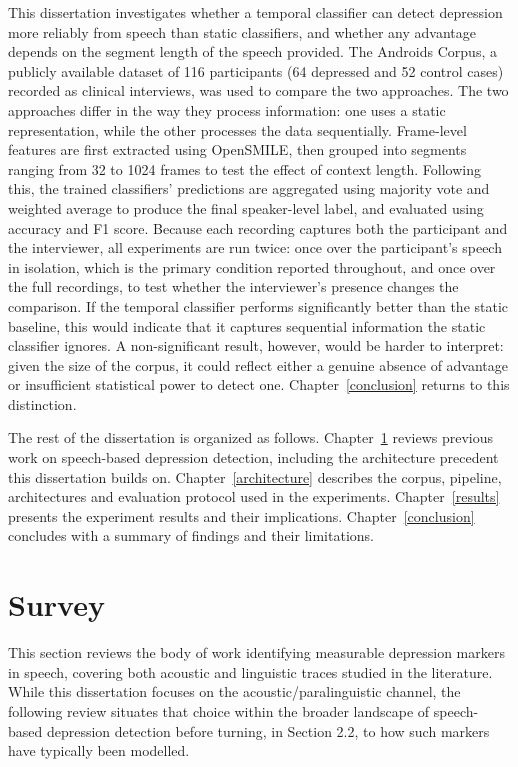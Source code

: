 \documentclass{mproj}
\begin{document}
This dissertation investigates whether a temporal classifier can detect depression more reliably from speech than static classifiers, and whether any advantage depends on the segment length of the speech provided. The Androids Corpus, a publicly available dataset of 116 participants (64 depressed and 52 control cases) recorded as clinical interviews, was used to compare the two approaches. The two approaches differ in the way they process information: one uses a static representation, while the other processes the data sequentially. Frame-level features are first extracted using OpenSMILE, then grouped into segments ranging from 32 to 1024 frames to test the effect of context length. Following this, the trained classifiers' predictions are aggregated using majority vote and weighted average to produce the final speaker-level label, and evaluated using accuracy and F1 score. Because each recording captures both the participant and the interviewer, all experiments are run twice: once over the participant's speech in isolation, which is the primary condition reported throughout, and once over the full recordings, to test whether the interviewer's presence changes the comparison. If the temporal classifier performs significantly better than the static baseline, this would indicate that it captures sequential information the static classifier ignores. A non-significant result, however, would be harder to interpret: given the size of the corpus, it could reflect either a genuine absence of advantage or insufficient statistical power to detect one. Chapter~\ref{conclusion} returns to this distinction.

The rest of the dissertation is organized as follows. Chapter~\ref{survey} reviews previous work on speech-based depression detection, including the architecture precedent this dissertation builds on. Chapter~\ref{architecture} describes the corpus, pipeline, architectures and evaluation protocol used in the experiments. Chapter~\ref{results} presents the experiment results and their implications. Chapter~\ref{conclusion} concludes with a summary of findings and their limitations.

\chapter{Survey}\label{survey}

This section reviews the body of work identifying measurable depression markers in speech, covering both acoustic and linguistic traces studied in the literature. While this dissertation focuses on the acoustic/paralinguistic channel, the following review situates that choice within the broader landscape of speech-based depression detection before turning, in Section 2.2, to how such markers have typically been modelled.
\end{document}
